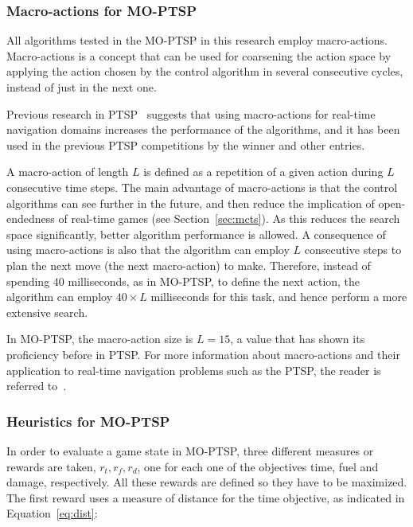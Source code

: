 \documentclass[journal]{IEEEtran}
\begin{document}
\subsubsection{Macro-actions for MO-PTSP} \label{sssec:macro}

All algorithms tested in the MO-PTSP in this research employ macro-actions. Macro-actions is a concept that can be used for coarsening the action space by applying the action chosen by the control algorithm in several consecutive cycles, instead of just in the next one. 

Previous research in PTSP~\cite{Perez2013, Perez2012} suggests that using macro-actions for real-time navigation domains increases the performance of the algorithms, and it has been used in the previous PTSP competitions by the winner and other entries.

A macro-action of length $L$ is defined as a repetition of a given action during $L$ consecutive time steps. The main advantage of macro-actions is that the control algorithms can see further in the future, and then reduce the implication of open-endedness of real-time games (see Section~\ref{sec:mcts}). As this reduces the search space significantly, better algorithm performance is allowed. A consequence of using macro-actions is also that the algorithm can employ $L$ consecutive steps to plan the next move (the next macro-action) to make. Therefore, instead of spending $40$ milliseconds, as in MO-PTSP, to define the next action, the algorithm can employ $40 \times L$ milliseconds for this task, and hence perform a more extensive search. 

In MO-PTSP, the macro-action size is $L = 15$, a value that has shown its proficiency before in PTSP. For more information about macro-actions and their application to real-time navigation problems such as the PTSP, the reader is referred to~\cite{Perez2013}.

\subsubsection{Heuristics for MO-PTSP} \label{sssec:heurMOPTSP}

In order to evaluate a game state in MO-PTSP, three different measures or rewards are taken, $r_t, r_f, r_d$, one for each one of the objectives time, fuel and damage, respectively. All these rewards are defined so they have to be maximized. The first reward uses a measure of distance for the time objective, as indicated in Equation~\ref{eq:dist}: 
\end{document}
